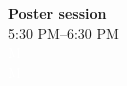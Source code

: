 \begin{calendar}{\textwidth}
{%
\textbf{Poster session} \\\vspace{0.1cm} 5:30 PM--6:30 PM \\\vspace{0.5cm} \textcolor{white}{M} \\ \textcolor{white}{M} \\\daysep
}



\end{calendar}

